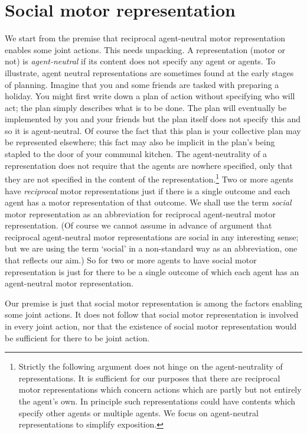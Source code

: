\documentclass[12pt,\papersize]{extarticle}
\begin{document}
\section{Social motor representation}
We start from the premise that reciprocal agent-neutral motor representation enables some joint actions.
This needs unpacking.
A representation (motor or not) is \emph{agent-neutral} if its content does not specify any agent or agents.
To illustrate, agent neutral representations are sometimes found at the early stages of planning.
Imagine that you and some friends are tasked with preparing a holiday.  
You might first write down a plan of action without specifying who will act; the plan simply describes what is to be done.
The plan  will eventually be implemented by you and your friends but the plan itself does not specify this and so it is agent-neutral.
Of course the fact that this plan is your collective plan may be represented elsewhere; this fact may also be implicit in  the plan's being stapled to the door of your communal kitchen.
The agent-neutrality of a representation does not require that the agents are nowhere specified, only that they are not specified in the content of the representation.\footnote{
Strictly the following argument does not hinge on the agent-neutrality of representations.
It is sufficient for our purposes that there are reciprocal motor representations which concern actions which are partly but not entirely the agent's own.
In principle such representations could have contents which specify other agents or multiple agents.
We focus on agent-neutral representations to simplify exposition.
}
Two or more agents have \emph{reciprocal} motor representations  just if there is a single outcome and each agent has a motor representation of that outcome.
We shall use the term \emph{social} motor representation as an abbreviation for reciprocal agent-neutral motor representation.
(Of course we cannot assume in advance of argument that reciprocal agent-neutral motor representations are social in any interesting sense;
but we are using the term `social' in a non-standard way as an abbreviation, one that reflects our aim.)
So for two or more agents to have social motor representation is just for there to be a single outcome of which each agent has an agent-neutral motor representation.

Our premise is just that social motor representation is among the factors enabling some joint actions.
It does not follow that social motor representation is involved in every joint action,
nor that the existence of social motor representation would be sufficient for there to be joint action.
\end{document}
